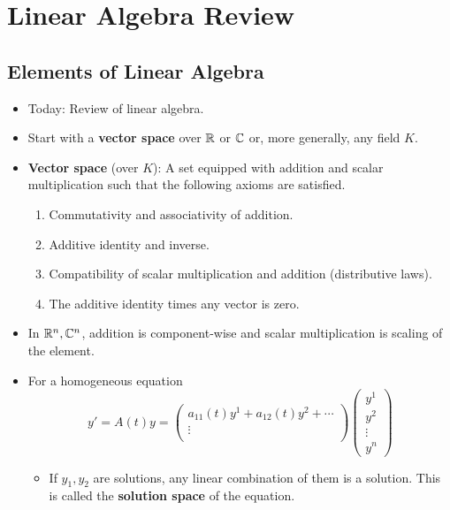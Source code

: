 \documentclass[../notes.tex]{subfiles}
\begin{document}
\chapter{Linear Algebra Review}
\section{Elements of Linear Algebra}
\begin{itemize}
    \item {}Today: Review of linear algebra.
    \item Start with a \textbf{vector space} over $\mathbb{R}$ or $\mathbb{C}$ or, more generally, any field $K$.
    \item \textbf{Vector space} (over $K$): A set equipped with addition and scalar multiplication such that the following axioms are satisfied.
    \begin{enumerate}
        \item Commutativity and associativity of addition.
        \item Additive identity and inverse.
        \item Compatibility of scalar multiplication and addition (distributive laws).
        \item The additive identity times any vector is zero.
    \end{enumerate}
    \item In $\mathbb{R}^n,\mathbb{C}^n$, addition is component-wise and scalar multiplication is scaling of the element.
    \item For a homogeneous equation
    \begin{equation*}
        y' = A(t)y
        =
        \begin{pmatrix}
            a_{11}(t)y^1+a_{12}(t)y^2+\cdots\\
            \vdots\\
        \end{pmatrix}
        \begin{pmatrix}
            y^1\\
            y^2\\
            \vdots\\
            y^n
        \end{pmatrix}
    \end{equation*}
    \begin{itemize}
        \item If $y_1,y_2$ are solutions, any linear combination of them is a solution. This is called the \textbf{solution space} of the equation.

\end{itemize}
\end{itemize}
\end{document}
